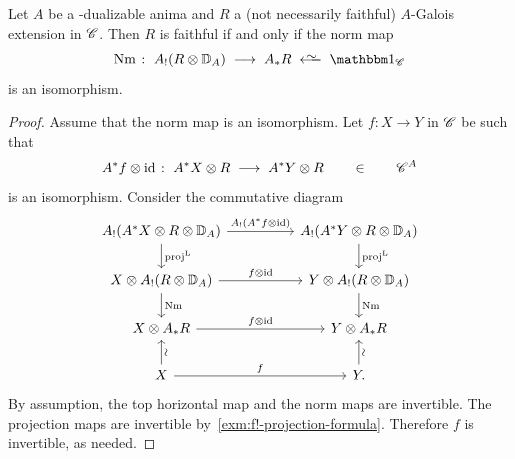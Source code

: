 \documentclass[english,svgnames,table]{article}
\begin{document}
    \begin{proposition}
    \label{prop:faithful<=>Nm-is-iso}
        Let $A$ be a \COB-dualizable anima and $R$ a (not necessarily faithful) $A$-Galois extension in $\mathscr{C}$. Then $R$ is faithful if and only if the norm map
        \begin{equation*}
            \Nm \;\colon\; A_!(R \otimes \DD_A) \;\too\; A_* R \;\isogetss\; \ounit_{\cC}
        \end{equation*}
        is an isomorphism.
    \end{proposition}
    \begin{proof}
        Assume that the norm map is an isomorphism. Let $f \colon X \to Y$ in $\mathscr{C}$ be such that
        \begin{equation*}
            A^* f \otimes \mathrm{id} \;\colon\; A^* X \otimes R \;\longrightarrow\; A^* Y \otimes R \qquad \in \qquad \mathscr{C}^A
        \end{equation*}
        is an isomorphism. Consider the commutative diagram
        \begin{equation*}
            \begin{tikzcd}
                {A_!(A^* X \otimes R\otimes \DD_A)} && {A_!(A^* Y \otimes R \otimes \DD_A)} \\
                {X \otimes A_!(R \otimes \DD_A)} && {Y \otimes A_!(R \otimes \DD_A)} \\
                {X \otimes A_*R} && {Y \otimes A_*R} \\
                X && Y.
                \arrow["{A_!(A^* f \otimes \id)}", from=1-1, to=1-3]
                \arrow["\Lproj", from=1-1, to=2-1]
                \arrow["\Lproj", from=1-3, to=2-3]
            	\arrow["{f \otimes \id}", from=2-1, to=2-3]
                \arrow["\Nm", from=2-1, to=3-1]
                \arrow["\Nm", from=2-3, to=3-3]
                \arrow["{f \otimes \id}", from=3-1, to=3-3]
                \arrow["{\rotatebox{90}{$\sim$}}"', from=4-1, to=3-1]
                \arrow["f", from=4-1, to=4-3]
                \arrow["{\rotatebox{90}{$\sim$}}"', from=4-3, to=3-3]
            \end{tikzcd}
        \end{equation*}
        By assumption, the top horizontal map and the norm maps are invertible. The projection maps are invertible by~\cref{exm:f!-projection-formula}. Therefore $f$ is invertible, as needed.


\end{proof}
\end{document}

